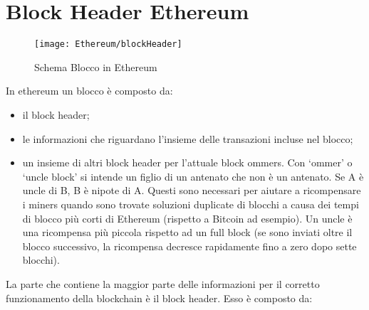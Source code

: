 %
%
\chapter{Block Header Ethereum}
%
\label{cap:blockheader}
%
\begin{figure}[H]
	\centering
	\texttt{[image: Ethereum/blockHeader]}
	\caption{Schema Blocco in Ethereum}
	\label{fig:schema blocco in Ethereum}
\end{figure}
In ethereum un blocco è composto da:
\begin{itemize}
	\item il block header;
	\item le informazioni che riguardano l'insieme delle transazioni incluse nel blocco;
	\item un insieme di altri block header per l'attuale block ommers. Con \enquote*{ommer} o \enquote*{uncle block} si intende un figlio di un antenato che non è un antenato. Se A è uncle di B, B è nipote di A. Questi sono necessari per aiutare a ricompensare i miners quando sono trovate soluzioni duplicate di blocchi a causa dei tempi di blocco più corti di Ethereum (rispetto a Bitcoin ad esempio). Un uncle è una ricompensa più piccola rispetto ad un full block (se sono inviati oltre il blocco successivo, la ricompensa decresce rapidamente fino a zero dopo sette blocchi).
\end{itemize}%
La parte che contiene la maggior parte delle informazioni per il corretto funzionamento della blockchain è il block header. Esso è composto da:
